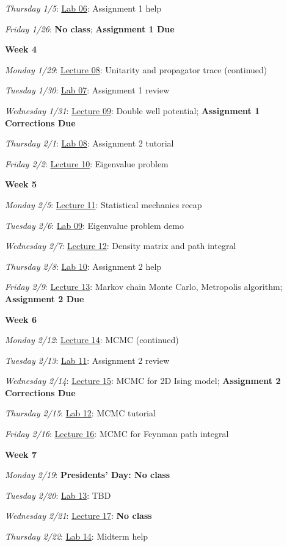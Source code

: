 \documentclass[12pt]{article}
\begin{document}
\emph{Thursday 1/5}: \underline{Lab 06}: Assignment 1 help

\emph{Friday 1/26}: \textbf{No class}; \textbf{Assignment 1 Due}

\noindent\textbf{Week 4}

\emph{Monday 1/29}: \underline{Lecture 08}: Unitarity and propagator trace (continued)

\emph{Tuesday 1/30}: \underline{Lab 07}: Assignment 1 review

\emph{Wednesday 1/31}: \underline{Lecture 09}: Double well potential; \textbf{Assignment 1 Corrections Due}

\emph{Thursday 2/1}: \underline{Lab 08}: Assignment 2 tutorial

\emph{Friday 2/2}: \underline{Lecture 10}: Eigenvalue problem

\noindent\textbf{Week 5}

\emph{Monday 2/5}: \underline{Lecture 11}: Statistical mechanics recap

\emph{Tuesday 2/6}: \underline{Lab 09}: Eigenvalue problem demo

\emph{Wednesday 2/7}: \underline{Lecture 12}: Density matrix and path integral

\emph{Thursday 2/8}: \underline{Lab 10}: Assignment 2 help

\emph{Friday 2/9}: \underline{Lecture 13}: Markov chain Monte Carlo, Metropolis algorithm; \textbf{Assignment 2 Due}

\noindent\textbf{Week 6}

\emph{Monday 2/12}: \underline{Lecture 14}: MCMC (continued)

\emph{Tuesday 2/13}: \underline{Lab 11}: Assignment 2 review

\emph{Wednesday 2/14}: \underline{Lecture 15}: MCMC for 2D Ising model; \textbf{Assignment 2 Corrections Due}

\emph{Thursday 2/15}: \underline{Lab 12}: MCMC tutorial

\emph{Friday 2/16}: \underline{Lecture 16}: MCMC for Feynman path integral

\noindent\textbf{Week 7}

\emph{Monday 2/19}: \textbf{Presidents' Day: No class}

\emph{Tuesday 2/20}: \underline{Lab 13}: TBD

\emph{Wednesday 2/21}: \underline{Lecture 17}: \textbf{No class}

\emph{Thursday 2/22}: \underline{Lab 14}: Midterm help
\end{document}
